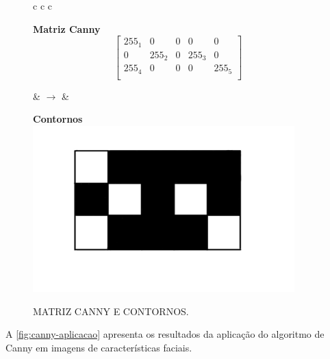 \begin{figure}[ht]
    \caption{MATRIZ CANNY E CONTORNOS.}
    \label{fig:canny-contornos}
    \centering
    \begin{tabular}{c c c}
        \begin{minipage}{0.4\textwidth}
            \centering
            \textbf{Matriz Canny}\\ [0.2cm]
            \[
            \begin{bmatrix}
                255_1 & 0 & 0 & 0 & 0 \\
                0 & 255_2 & 0 & 255_3 & 0 \\
                255_4 & 0 & 0 & 0 & 255_5 \\
            \end{bmatrix}
            \]
        \end{minipage}
        \hspace{0.5cm}
        
        & $\rightarrow$ &
        \begin{minipage}{0.4\textwidth}
            \centering
            \textbf{Contornos}\\ [0.2cm]
            \includegraphics[width=0.9\textwidth]{fig/contorno_canny.jpeg}
        \end{minipage}
    \end{tabular}
\end{figure}

A \autoref{fig:canny-aplicacao} apresenta os resultados da aplicação do algoritmo de Canny em imagens de características faciais.


